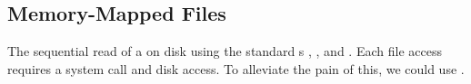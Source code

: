 \subsection{Memory-Mapped Files}\label{subsec:Memory_Mapped_Files}
The sequential read of a  on disk using the standard s , , and .
Each file access requires a system call and disk access.
To alleviate the pain of this, we could use .


